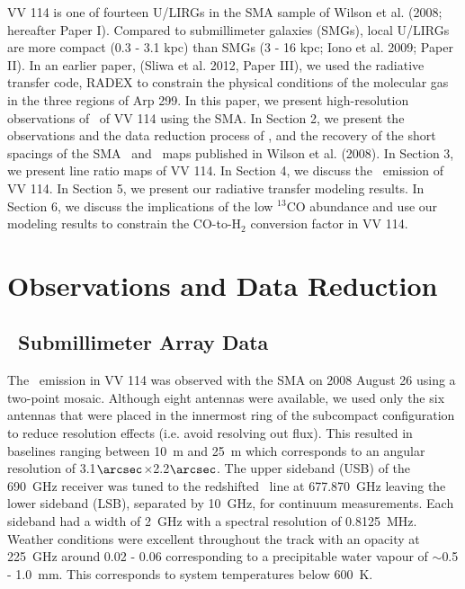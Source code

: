 VV 114 is one of fourteen U/LIRGs in the SMA sample of Wilson et al. (2008; hereafter Paper I)\nocite{2008ApJS..178..189W}. Compared to submillimeter galaxies (SMGs), local U/LIRGs are more compact (0.3 - 3.1 kpc) than SMGs (3 - 16 kpc; Iono et al. 2009; Paper II). \nocite{2009ApJ...695.1537I}In an earlier paper, \nocite{2012ApJ...753...46S} (Sliwa et al. 2012, Paper III), we used the radiative transfer code, RADEX \citep{2007A&A...468..627V} to constrain the physical conditions of the molecular gas in the three regions of Arp 299. In this paper, we present high-resolution observations of \cosix\ of VV 114 using the SMA. In Section 2, we present the observations and the data reduction process of \cosix, and the recovery of the short spacings of the SMA \cotwo\ and \cothree\ maps published in Wilson et al. (2008).  In Section 3, we present line ratio maps of VV 114. In Section 4, we discuss the \cosix\ emission of VV 114. In Section 5, we present our radiative transfer modeling results. In Section 6, we discuss the implications of the low $^{13}$CO abundance and use our modeling results to constrain the CO-to-H$_{2}$ conversion factor in VV 114.
\section{Observations and Data Reduction} %
\subsection{\cosix\ Submillimeter Array Data} %
The \cosix\ emission in VV 114 was observed with the SMA on 2008 August 26 using a two-point mosaic. Although eight antennas were available, we used only the six antennas that were placed in the innermost ring of the subcompact configuration to reduce resolution effects (i.e. avoid resolving out flux). This resulted in baselines ranging between 10~m and 25~m which corresponds to an angular resolution of 3.1$\arcsec$$\times$2.2$\arcsec$. The upper sideband (USB) of the 690~GHz receiver was tuned to the redshifted \cosix\ line at 677.870~GHz leaving the lower sideband (LSB), separated by 10~GHz, for continuum measurements. Each sideband had a width of 2~GHz with a spectral resolution of 0.8125~MHz.  Weather conditions were excellent throughout the track with an opacity at 225~GHz around 0.02 - 0.06 corresponding to a precipitable water vapour of $\sim$0.5 - 1.0~mm. This corresponds to system temperatures below 600~K. 

